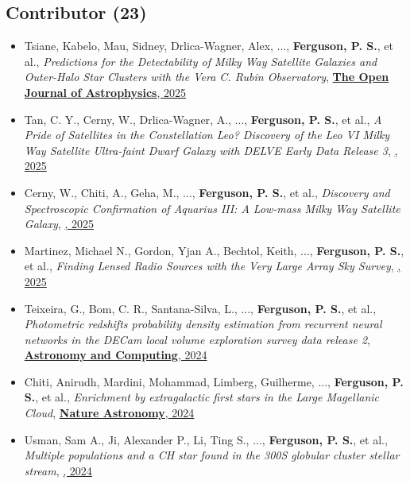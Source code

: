 \subsection{Contributor  (23)}
\begin{itemize}[itemsep=1pt]
    \item {Tsiane}, Kabelo, {Mau}, Sidney, {Drlica-Wagner}, Alex, ..., \textbf{Ferguson, P. S.}, et al., \textit{{Predictions for the Detectability of Milky Way Satellite Galaxies and Outer-Halo Star Clusters with the Vera C. Rubin Observatory}}, \href{https://ui.adsabs.harvard.edu/abs/2025OJAp....8E..89T}{\textbf{The Open Journal of Astrophysics}, 2025}
    \item {Tan}, C. Y., {Cerny}, W., {Drlica-Wagner}, A., ..., \textbf{Ferguson, P. S.}, et al., \textit{{A Pride of Satellites in the Constellation Leo? Discovery of the Leo VI Milky Way Satellite Ultra-faint Dwarf Galaxy with DELVE Early Data Release 3}}, \href{https://ui.adsabs.harvard.edu/abs/2025ApJ...979..176T}{\textbf{\apj}, 2025}
    \item {Cerny}, W., {Chiti}, A., {Geha}, M., ..., \textbf{Ferguson, P. S.}, et al., \textit{{Discovery and Spectroscopic Confirmation of Aquarius III: A Low-mass Milky Way Satellite Galaxy}}, \href{https://ui.adsabs.harvard.edu/abs/2025ApJ...979..164C}{\textbf{\apj}, 2025}
    \item {Martinez}, Michael N., {Gordon}, Yjan A., {Bechtol}, Keith, ..., \textbf{Ferguson, P. S.}, et al., \textit{{Finding Lensed Radio Sources with the Very Large Array Sky Survey}}, \href{https://ui.adsabs.harvard.edu/abs/2025ApJ...979..132M}{\textbf{\apj}, 2025}
    \item {Teixeira}, G., {Bom}, C. R., {Santana-Silva}, L., ..., \textbf{Ferguson, P. S.}, et al., \textit{{Photometric redshifts probability density estimation from recurrent neural networks in the DECam local volume exploration survey data release 2}}, \href{https://ui.adsabs.harvard.edu/abs/2024A&C....4900886T}{\textbf{Astronomy and Computing}, 2024}
    \item {Chiti}, Anirudh, {Mardini}, Mohammad, {Limberg}, Guilherme, ..., \textbf{Ferguson, P. S.}, et al., \textit{{Enrichment by extragalactic first stars in the Large Magellanic Cloud}}, \href{https://ui.adsabs.harvard.edu/abs/2024NatAs...8..637C}{\textbf{Nature Astronomy}, 2024}
    \item {Usman}, Sam A., {Ji}, Alexander P., {Li}, Ting S., ..., \textbf{Ferguson, P. S.}, et al., \textit{{Multiple populations and a CH star found in the 300S globular cluster stellar stream}}, \href{https://ui.adsabs.harvard.edu/abs/2024MNRAS.529.2413U}{\textbf{\mnras}, 2024}

\end{itemize}
